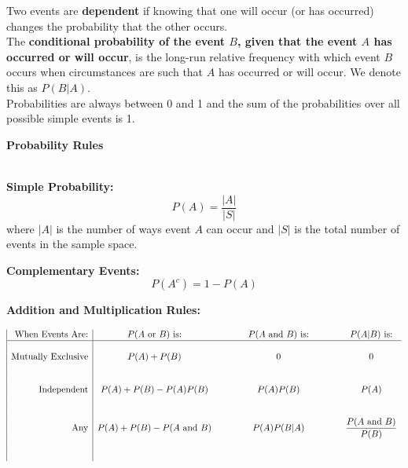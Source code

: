 \documentclass[12pt]{amsart}
\begin{document}
\begin{list}
\subitem Two events are {\bf dependent} if knowing that one will occur (or has occurred) changes the probability that the other occurs.\\

\subitem The {\bf conditional probability of the event $B$, given that the event $A$ has occurred or will occur}, is the long-run relative frequency with which event $B$ occurs when circumstances are such that $A$ has occurred or will occur.  We denote this as $P(B\vert A)$.\\

\subitem Probabilities are always between 0 and 1 and the sum of the probabilities over all possible simple events is 1.

\newpage

\item[] {\bf Probability Rules}\\ \\

\item[] {\bf Simple Probability:} $$P(A)=\frac{\vert A\vert}{\vert S\vert}$$ where $\vert A\vert$ is the number of ways event $A$ can occur and $\vert S\vert$ is the total number of events in the sample space.

\vspace{.2in}

\item[] {\bf Complementary Events:} $$P(A^c)=1-P(A)$$

\vspace{.2in}

\item[] {\bf Addition and Multiplication Rules:}

$$\begin{array}{|r|ccccc}
\text{When Events Are:}&P(A {\text{ or }} B) \text{ is:}&\qquad&P(A {\text{ and }} B) \text{ is:}&\qquad&P(A\vert B) \text{ is:}\\ 
\hline
&\\
\text{Mutually Exclusive}& P(A)+P(B) && 0 && 0 \\ & \\ & \\
\text{Independent}& P(A)+P(B)-P(A)P(B) && P(A)P(B) && P(A) \\ & \\ & \\
\text{Any}& P(A)+P(B)-P(A{\text{ and }}B) && P(A)P(B\vert A) &&\dfrac{P(A{\text{ and }}B)}{P(B)}\\ & \\ & \\
\end{array}$$


\end{list}
\end{document}
